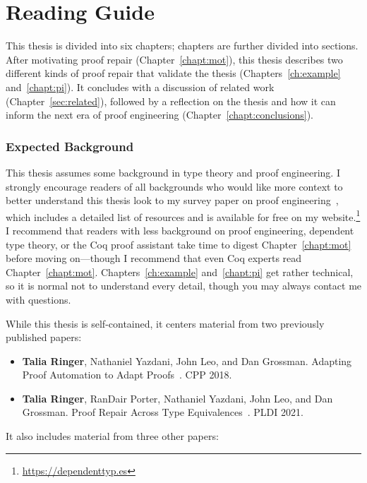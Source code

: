 \section{Reading Guide}


This thesis is divided into six chapters; chapters are further divided into sections.
After motivating proof repair (Chapter~\ref{chapt:mot}),
this thesis describes two different kinds of proof repair that validate the thesis (Chapters~\ref{ch:example} and~\ref{chapt:pi}).
It concludes with a discussion of related work (Chapter~\ref{sec:related}),
followed by a reflection on the thesis and how it can inform the next era of 
proof engineering (Chapter~\ref{chapt:conclusions}).

\subsubsection*{Expected Background}

This thesis assumes some background in type theory and proof engineering.
I strongly encourage readers of all backgrounds who would like more context to better understand this thesis
look to my survey paper on proof engineering~\cite{PGL-045}, which includes a detailed list of resources
and is available for free on my website.\footnote{\url{https://dependenttyp.es}}
I recommend that readers with less background on proof engineering, dependent type theory, or the Coq proof assistant
take time to digest Chapter~\ref{chapt:mot} before moving on---though I recommend that even Coq experts read Chapter~\ref{chapt:mot}.
Chapters~\ref{ch:example} and~\ref{chapt:pi} get rather technical, so it is normal not to understand every detail,
though you may always contact me with questions.

While this thesis is self-contained, it centers material from two previously published papers:

\begin{itemize}
\item \textbf{Talia Ringer}, Nathaniel Yazdani, John Leo, and Dan Grossman. Adapting Proof Automation to Adapt Proofs~\cite{ringer2018adapting}. CPP 2018.
\item \textbf{Talia Ringer}, RanDair Porter, Nathaniel Yazdani, John Leo, and Dan Grossman. Proof Repair Across Type Equivalences~\cite{Ringer2021}. PLDI 2021.
\end{itemize}
It also includes material from three other papers:

